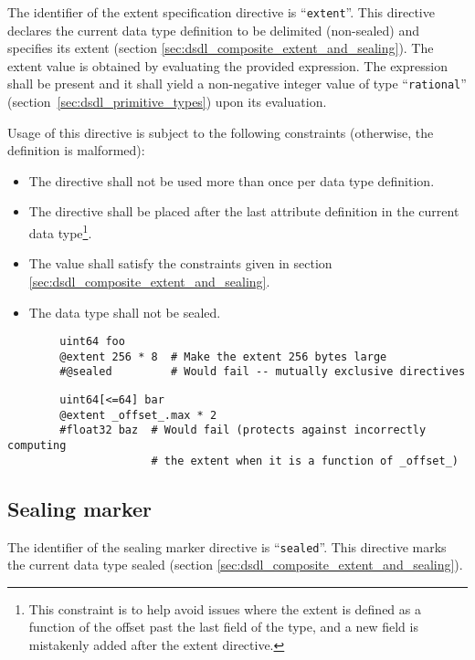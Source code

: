 The identifier of the extent specification directive is ``\verb|extent|''.
This directive declares the current data type definition to be delimited (non-sealed)
and specifies its extent (section \ref{sec:dsdl_composite_extent_and_sealing}).
The extent value is obtained by evaluating the provided expression.
The expression shall be present and it shall yield a non-negative integer value of type
``\verb|rational|'' (section~\ref{sec:dsdl_primitive_types}) upon its evaluation.

Usage of this directive is subject to the following constraints (otherwise, the definition is malformed):
\begin{itemize}
    \item The directive shall not be used more than once per data type definition.
    \item The directive shall be placed after the last attribute definition in the current data type\footnote{%
              This constraint is to help avoid issues where the extent is defined as a function of the offset past
              the last field of the type, and a new field is mistakenly added after the extent directive.
          }.
    \item The value shall satisfy the constraints given in section \ref{sec:dsdl_composite_extent_and_sealing}.
    \item The data type shall not be sealed.
\end{itemize}

\begin{remark}
    \begin{verbatim}
        uint64 foo
        @extent 256 * 8  # Make the extent 256 bytes large
        #@sealed         # Would fail -- mutually exclusive directives
    \end{verbatim}

    \begin{verbatim}
        uint64[<=64] bar
        @extent _offset_.max * 2
        #float32 baz  # Would fail (protects against incorrectly computing
                      # the extent when it is a function of _offset_)
    \end{verbatim}
\end{remark}

\subsection{Sealing marker}\label{sec:dsdl_directive_sealed}

The identifier of the sealing marker directive is ``\verb|sealed|''.
This directive marks the current data type sealed (section \ref{sec:dsdl_composite_extent_and_sealing}).

